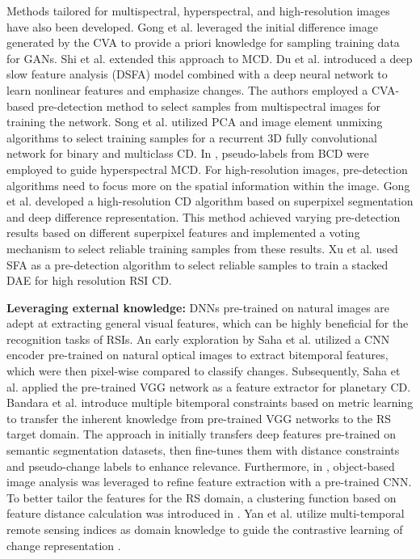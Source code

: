 \par Methods tailored for multispectral, hyperspectral, and high-resolution images have also been developed. Gong et al. \cite{gong2017generative, 2019GenerativeGong} leveraged the initial difference image generated by the CVA to provide a priori knowledge for sampling training data for GANs. Shi et al. \cite{Shi2022Unsupervised} extended this approach to MCD. Du et al. \cite{Du2019Unsupervised} introduced a deep slow feature analysis (DSFA) model combined with a deep neural network to learn nonlinear features and emphasize changes. The authors employed a CVA-based pre-detection method to select samples from multispectral images for training the network. Song et al. \cite{Song2018Change} utilized PCA and image element unmixing algorithms to select training samples for a recurrent 3D fully convolutional network for binary and multiclass CD. In \cite{Hu2023Binary}, pseudo-labels from BCD were employed to guide hyperspectral MCD. For high-resolution images, pre-detection algorithms need to focus more on the spatial information within the image. Gong et al. \cite{Gong2017Superpixel} developed a high-resolution CD algorithm based on superpixel segmentation and deep difference representation. This method achieved varying pre-detection results based on different superpixel features and implemented a voting mechanism to select reliable training samples from these results. Xu et al. \cite{Xv2019Combining} used SFA as a pre-detection algorithm to select reliable samples to train a stacked DAE for high resolution RSI CD.

\textbf{Leveraging external knowledge:}
DNNs pre-trained on natural images are adept at extracting general visual features, which can be highly beneficial for the recognition tasks of RSIs. An early exploration by Saha et al. \cite{saha2019unsupervised} utilized a CNN encoder pre-trained on natural optical images to extract bitemporal features, which were then pixel-wise compared to classify changes. Subsequently, Saha et al. \cite{Saha2022Patch} applied the pre-trained VGG network as a feature extractor for planetary CD. Bandara et al. \cite{bandara2023deep} introduce multiple bitemporal constraints based on metric learning to transfer the inherent knowledge from pre-trained VGG networks to the RS target domain. The approach in \cite{liu2020convolutional} initially transfers deep features pre-trained on semantic segmentation datasets, then fine-tunes them with distance constraints and pseudo-change labels to enhance relevance. Furthermore, in \cite{Zhan2022Transfer}, object-based image analysis was leveraged to refine feature extraction with a pre-trained CNN. To better tailor the features for the RS domain, a clustering function based on feature distance calculation was introduced in \cite{sublime2019automatic}. Yan et al. utilize multi-temporal remote sensing indices as domain knowledge to guide the contrastive learning of change representation \cite{yan2023domain}. 

